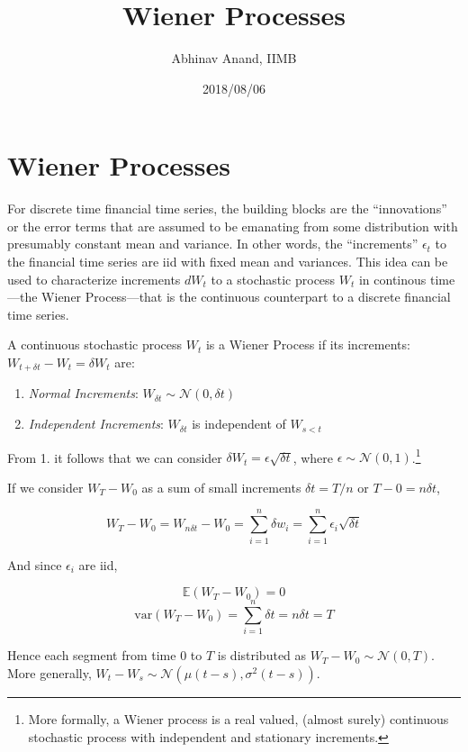 \documentclass[11pt,]{article}
\title{Wiener Processes}
\author{Abhinav Anand, IIMB}
\date{2018/08/06}
\providecommand{\tightlist}{%
  \setlength{\itemsep}{0pt}\setlength{\parskip}{0pt}}
\let\rmarkdownfootnote\footnote%
\def\footnote{\protect\rmarkdownfootnote}
\begin{document}
\maketitle

\section{Wiener Processes}\label{wiener-processes}

For discrete time financial time series, the building blocks are the
``innovations'' or the error terms that are assumed to be emanating from
some distribution with presumably constant mean and variance. In other
words, the ``increments'' \(\epsilon_t\) to the financial time series
are iid with fixed mean and variances. This idea can be used to
characterize increments \(dW_t\) to a stochastic process \(W_t\) in
continous time---the Wiener Process---that is the continuous counterpart
to a discrete financial time series.

A continuous stochastic process \(W_t\) is a Wiener Process if its
increments: \(W_{t+\delta t}-W_{t}=\delta W_t\) are:

\begin{enumerate}
\def\labelenumi{\arabic{enumi}.}
\tightlist
\item
  \emph{Normal Increments}:
  \(W_{\delta t}\sim \mathcal{N}(0, \delta t)\)
\item
  \emph{Independent Increments}: \(W_{\delta t}\) is independent of
  \(W_{s<t}\)
\end{enumerate}

From 1. it follows that we can consider
\(\delta W_t = \epsilon\sqrt{\delta t}\), where
\(\epsilon\sim \mathcal{N}(0,1)\).\footnote{More formally, a Wiener
  process is a real valued, (almost surely) continuous stochastic
  process with independent and stationary increments.}

If we consider \(W_T-W_0\) as a sum of small increments
\(\delta t = T/n\) or \(T - 0 = n\delta t\),

\[W_T-W_0=W_{n\delta t}-W_0=\sum_{i=1}^n \delta w_i = \sum_{i=1}^n \epsilon_i \sqrt{\delta t}\]

And since \(\epsilon_i\) are iid,

\[\mathbb{E}(W_T-W_0) = 0\]
\[\text{var}(W_T-W_0) = \sum_{i=1}^n \delta t = n\delta t = T\]

Hence each segment from time 0 to \(T\) is distributed as
\(W_T-W_0\sim\mathcal{N}(0, T)\). More generally,
\(W_t-W_s\sim \mathcal{N}(\mu(t-s), \sigma^2(t-s))\).
\end{document}
